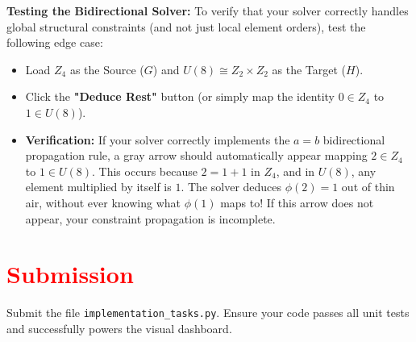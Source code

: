 \documentclass[11pt]{article}
\begin{document}
\textbf{Testing the Bidirectional Solver:} 
To verify that your solver correctly handles global structural constraints (and not just local element orders), test the following edge case:
\begin{itemize}
    \item Load $Z_4$ as the Source ($G$) and $U(8) \cong Z_2 \times Z_2$ as the Target ($H$).
    \item Click the \textbf{"Deduce Rest"} button (or simply map the identity $0 \in Z_4$ to $1 \in U(8)$).
    \item \textbf{Verification:} If your solver correctly implements the $a = b$ bidirectional propagation rule, a gray arrow should automatically appear mapping $2 \in Z_4$ to $1 \in U(8)$. This occurs because $2 = 1+1$ in $Z_4$, and in $U(8)$, any element multiplied by itself is $1$. The solver deduces $\phi(2) = 1$ out of thin air, without ever knowing what $\phi(1)$ maps to! If this arrow does not appear, your constraint propagation is incomplete.
\end{itemize}


\section*{\textcolor{red}{Submission}}

Submit the file \texttt{implementation\_tasks.py}. Ensure your code passes all unit tests and successfully powers the visual dashboard.
\end{document}
